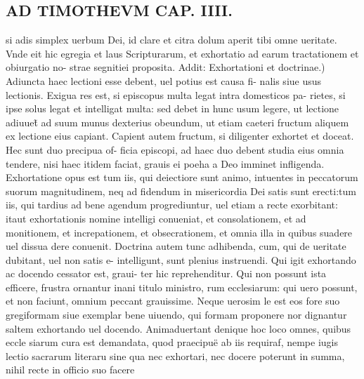\documentclass{article}
\begin{document}
\begin{pages}
\section*{AD TIMOTHEVM CAP. IIII. }
\marginpar{[ p.101 ]}\pstart si adis simplex uerbum Dei, id clare et citra dolum aperit tibi omne ueritate. Vnde eit hic egregia et laus Scripturarum, et exhortatio ad earum tractationem et obiurgatio no- strae segnitiei proposita. Addit:  \pend\pstart Exhortationi et doctrinae.) Adiuncta haec lectioni esse debent, uel potius est causa fi- nalis siue usus lectionis. Exigua res est, si episcopus multa legat intra domesticos pa- rietes, si ipse solus legat et intelligat multa: sed debet in hunc usum legere, ut lectione adiuuet̃ ad suum munus dexterius obeundum, ut etiam caeteri fructum aliquem ex lectione eius capiant. Capient autem fructum, si diligenter exhortet et doceat. Hec sunt duo precipua of- ficia episcopi, ad haec duo debent studia eius omnia tendere, nisi haec itidem faciat, grauis ei poeha a Deo imminet infligenda. Exhortatione opus est tum iis, qui deiectiore sunt animo, intuentes in peccatorum suorum magnitudinem, neq ad fidendum in misericordia Dei satis sunt erecti:tum iis, qui tardius ad bene agendum progrediuntur, uel etiam a recte exorbitant: itaut exhortationis nomine intelligi conueniat, et consolationem, et ad monitionem, et increpationem, et obsecrationem, et omnia illa in quibus suadere uel dissua dere conuenit. Doctrina autem tunc adhibenda, cum, qui de ueritate dubitant, uel non satis e- intelligunt, sunt plenius instruendi. Qui igit exhortando ac docendo cessator est, graui- ter hic reprehenditur. Qui non possunt ista efficere, frustra ornantur inani titulo ministro, rum ecclesiarum: qui uero possunt, et non faciunt, omnium peccant grauissime. Neque uerosim le est eos fore suo gregiformam siue exemplar bene uiuendo, qui formam proponere nor dignantur saltem exhortando uel docendo. Animaduertant denique hoc loco omnes, quibus eccle siarum cura est demandata, quod praecipuë ab iis requiraf, nempe iugis lectio sacrarum literaru sine qua nec exhortari, nec docere poterunt in summa, nihil recte in officio suo facere  \pend
{}
{}

\end{pages}
\end{document}
